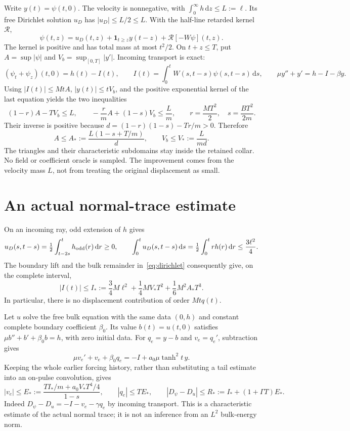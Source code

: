 \documentclass[11pt]{article}
\newcommand{\dd}{\,\mathrm d}
\begin{document}
Write $y(t)=\psi(t,0)$. The velocity is nonnegative, with
$\int_0^\infty h\dd z\le L:=\ell$. Its free Dirichlet solution $u_D$
has $|u_D|\le L/2\le L$. With the half-line retarded kernel $\mathcal R$,
\begin{equation}
 \psi(t,z)=u_D(t,z)+\mathbf1_{t\ge z}y(t-z)
                    +\mathcal R[-W\psi](t,z).
 \label{eq:dirichlet}
\end{equation}
The kernel is positive and has total mass at most $t^2/2$. On $t+z\le T$,
put $A=\sup|\psi|$ and $V_b=\sup_{[0,T]}|y'|$. Incoming transport is exact:
\begin{equation}
 (\psi_t+\psi_z)(t,0)=h(t)-I(t),\qquad
 I(t)=\int_0^tW(s,t-s)\psi(s,t-s)\dd s,\qquad
 \mu y''+y'=h-I-\beta y.
 \label{eq:incoming}
\end{equation}
Using $|I(t)|\le MtA$, $|y(t)|\le tV_b$, and the positive exponential
kernel of the last equation yields the two inequalities
\[
 (1-r)A-TV_b\le L,\qquad
 -\frac rm A+(1-s)V_b\le\frac Lm,
 \qquad r=\frac{MT^2}{2},\quad s=\frac{BT^2}{2m}.
\]
Their inverse is positive because $d=(1-r)(1-s)-Tr/m>0$. Therefore
\begin{equation}
 A\le A_*:=\frac{L(1-s+T/m)}d,\qquad
 V_b\le V_*:=\frac{L}{md}.
 \label{eq:majorants}
\end{equation}
The triangles and their characteristic subdomains stay inside the retained
collar. No field or coefficient oracle is sampled. The improvement comes
from the velocity mass $L$, not from treating the original displacement
as small.

\section{An actual normal-trace estimate}
On an incoming ray, odd extension of $h$ gives
\[
 u_D(s,t-s)=\tfrac12\int_{t-2s}^t h_{\rm odd}(r)\dd r\ge0,
 \qquad
 \int_0^tu_D(s,t-s)\dd s=\tfrac12\int_0^t r h(r)\dd r
 \le\frac{3\ell^2}{4}.
\]
The boundary lift and the bulk remainder in~\eqref{eq:dirichlet} consequently
give, on the complete interval,
\begin{equation}
 |I(t)|\le I_*:=\frac34M\ell^2+\frac14MV_*T^2
                         +\frac16M^2A_*T^3.
 \label{eq:I}
\end{equation}
In particular, there is no displacement contribution of order $Mtq(t)$.

Let $u$ solve the free bulk equation with the same data $(0,h)$ and constant
complete boundary coefficient $\beta_0$. Its value $b(t)=u(t,0)$ satisfies
$\mu b''+b'+\beta_0b=h$, with zero initial data. For $q_e=y-b$ and
$v_e=q_e'$, subtraction gives
\[
 \mu v_e'+v_e+\beta_0q_e=-I+a_0\mu\tanh^2t\,y.
\]
Keeping the whole earlier forcing history, rather than substituting a tail
estimate into an on-pulse convolution, gives
\begin{equation}
 |v_e|\le E_*:=\frac{TI_*/m+a_0V_*T^4/4}{1-s},\qquad
 |q_e|\le TE_*,\qquad
 |D_\psi-D_u|\le R_*:=I_*+(1+\Gamma T)E_*.
 \label{eq:error}
\end{equation}
Indeed $D_\psi-D_u=-I-v_e-\gamma q_e$ by incoming transport.
This is a characteristic estimate of the actual normal trace; it is not
an inference from an $L^2$ bulk-energy norm.
\end{document}

